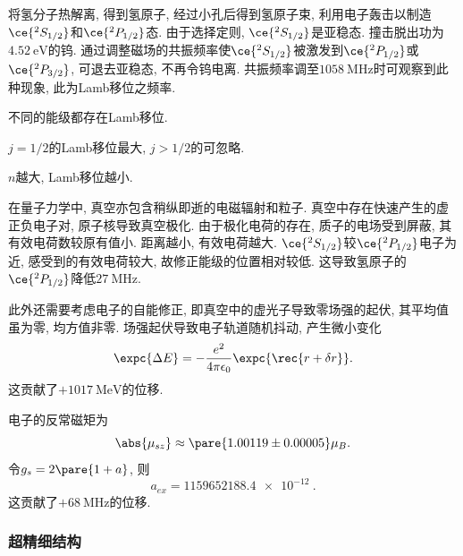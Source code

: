 \documentclass[hidelinks]{ctexart}
\begin{document}
将氢分子热解离, 得到氢原子, 经过小孔后得到氢原子束, 利用电子轰击以制造$\ce{^2S_{1/2}}$和$\ce{^2P_{1/2}}$态. 由于选择定则, $\ce{^2S_{1/2}}$是亚稳态. 撞击脱出功为$\SI{4.52}{\eV}$的钨. 通过调整磁场的共振频率使$\ce{^2S_{1/2}}$被激发到$\ce{^2P_{1/2}}$或$\ce{^2P_{3/2}}$, 可退去亚稳态, 不再令钨电离. 共振频率调至$\SI{1058}{\mega\hertz}$时可观察到此种现象, 此为Lamb移位之频率.
\begin{cenum}
    \item 不同的能级都存在Lamb移位.
    \item $j=1/2$的Lamb移位最大, $j>1/2$的可忽略.
    \item $n$越大, Lamb移位越小.
\end{cenum}
\begin{remark}[物理图像]
    在量子力学中, 真空亦包含稍纵即逝的电磁辐射和粒子. 真空中存在快速产生的虚正负电子对, 原子核导致真空极化. 由于极化电荷的存在, 质子的电场受到屏蔽, 其有效电荷数较原有值小. 距离越小, 有效电荷越大. $\ce{^2S_{1/2}}$较$\ce{^2P_{1/2}}$电子为近, 感受到的有效电荷较大, 故修正能级的位置相对较低. 这导致氢原子的$\ce{^2P_{1/2}}$降低$\SI{27}{\mega\hertz}$.
    \par
    此外还需要考虑电子的自能修正, 即真空中的虚光子导致零场强的起伏, 其平均值虽为零, 均方值非零. 场强起伏导致电子轨道随机抖动, 产生微小变化
    \[ \expc{\Delta E} = -\frac{e^2}{4\pi\epsilon_0}\expc{\rec{r+\delta r}}. \]
    这贡献了$+\SI{1017}{\mega\eV}$的位移.
    \par
    电子的反常磁矩为
    \[ \abs{\mu_{sz}} \approx \pare{1.00119 \pm 0.00005}\mu_B. \]
    令$g_s = 2\pare{1+a}$, 则
    \[ a_{ex} = \SI{1159652188.4e-12}{}. \]
    这贡献了$+\SI{68}{\mega\hertz}$的位移.
\end{remark}


\subsubsection{超精细结构} %
\label{ssub:超精细结构}
\end{document}
